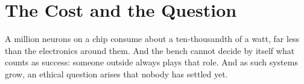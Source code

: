 \section*{The Cost and the Question}

A million neurons on a chip consume about a ten-thousandth of a watt, far less than the electronics around them. And the bench cannot decide by itself what counts as success: someone outside always plays that role. And as such systems grow, an ethical question arises that nobody has settled yet.

